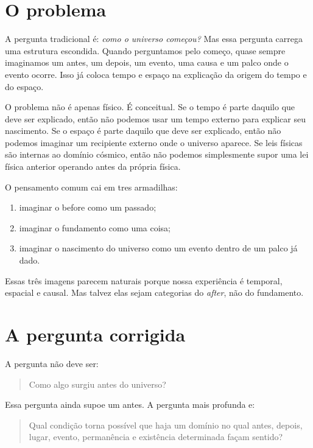 \documentclass[11pt,a4paper]{article}
\begin{document}
\section{O problema}

A pergunta tradicional é: \emph{como o universo começou?} Mas essa pergunta carrega uma estrutura escondida. Quando perguntamos pelo começo, quase sempre imaginamos um antes, um depois, um evento, uma causa e um palco onde o evento ocorre. Isso já coloca tempo e espaço na explicação da origem do tempo e do espaço.

O problema não é apenas físico. É conceitual. Se o tempo é parte daquilo que deve ser explicado, então não podemos usar um tempo externo para explicar seu nascimento. Se o espaço é parte daquilo que deve ser explicado, então não podemos imaginar um recipiente externo onde o universo aparece. Se leis físicas são internas ao domínio cósmico, então não podemos simplesmente supor uma lei física anterior operando antes da própria física.

O pensamento comum cai em tres armadilhas:

\begin{enumerate}
    \item imaginar o before como um passado;
    \item imaginar o fundamento como uma coisa;
    \item imaginar o nascimento do universo como um evento dentro de um palco já dado.
\end{enumerate}

Essas três imagens parecem naturais porque nossa experiência é temporal, espacial e causal. Mas talvez elas sejam categorias do \emph{after}, não do fundamento.

\section{A pergunta corrigida}

A pergunta não deve ser:

\begin{quote}
Como algo surgiu antes do universo?
\end{quote}

Essa pergunta ainda supoe um antes. A pergunta mais profunda e:

\begin{quote}
Qual condição torna possível que haja um domínio no qual antes, depois, lugar, evento, permanência e existência determinada façam sentido?
\end{quote}
\end{document}
